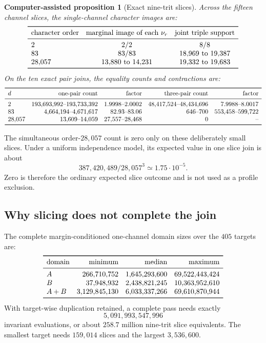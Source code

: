 \documentclass[11pt]{article}
\newtheorem{computationalproposition}[theorem]{Computer-assisted proposition}
\theoremstyle{remark}
\begin{document}
\begin{computationalproposition}[Exact nine-trit slices]
\label{prop:slices}
Across the fifteen channel slices, the single-channel character images are:
\[
\begin{array}{lcc}
\toprule
\text{character order}&\text{marginal image of each }\nu_r&
\text{joint triple support}\\
\midrule
2&2/2&8/8\\
83&83/83&18{,}969\text{ to }19{,}387\\
28{,}057&13{,}880\text{ to }14{,}231&
19{,}332\text{ to }19{,}683\\
\bottomrule
\end{array}
\]
On the ten exact pair joins, the equality counts and contractions are:
\[
\begin{array}{lrrrr}
\toprule
d&\text{one-pair count}&\text{factor}&\text{three-pair count}&\text{factor}\\
\midrule
2&193{,}693{,}992\text{--}193{,}733{,}392&
1.9998\text{--}2.0002&
48{,}417{,}524\text{--}48{,}434{,}696&
7.9988\text{--}8.0017\\
83&4{,}664{,}194\text{--}4{,}671{,}617&
82.93\text{--}83.06&
646\text{--}700&
553{,}458\text{--}599{,}722\\
28{,}057&13{,}609\text{--}14{,}059&
27{,}557\text{--}28{,}468&
0&\text{--}\\
\bottomrule
\end{array}
\]
\end{computationalproposition}

The simultaneous order-$28{,}057$ count is zero only on these deliberately
small slices.  Under a uniform independence model, its expected value in
one slice join is about
\[
 387{,}420{,}489/28{,}057^3\simeq1.75\cdot10^{-5}.
\]
Zero is therefore the ordinary expected slice outcome and is not used as a
profile exclusion.

\subsection{Why slicing does not complete the join}

The complete margin-conditioned one-channel domain sizes over the $405$
targets are:
\[
\begin{array}{lrrr}
\toprule
\text{domain}&\text{minimum}&\text{median}&\text{maximum}\\
\midrule
A&266{,}710{,}752&1{,}645{,}293{,}600&69{,}522{,}443{,}424\\
B&37{,}948{,}932&2{,}438{,}821{,}245&10{,}363{,}952{,}610\\
A+B&3{,}129{,}845{,}130&6{,}033{,}337{,}266&69{,}610{,}870{,}944\\
\bottomrule
\end{array}
\]
With target-wise duplication retained, a complete pass needs exactly
\begin{equation}
 5{,}091{,}993{,}547{,}996
 \label{eq:evaluations}
\end{equation}
invariant evaluations, or about $258.7$ million nine-trit slice
equivalents.  The smallest target needs $159{,}014$ slices and the largest
$3{,}536{,}600$.
\end{document}
